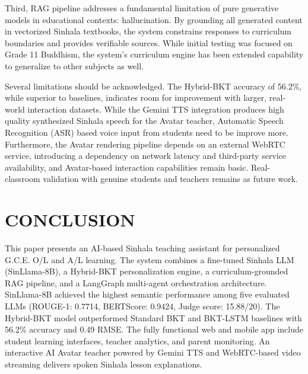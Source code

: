 \documentclass[conference]{IEEEtran}
\begin{document}
Third, RAG pipeline addresses a fundamental limitation of pure generative models in educational contexts: hallucination. By grounding all generated content in vectorized Sinhala textbooks, the system constrains responses to curriculum boundaries and provides verifiable sources. While initial testing was focused on Grade 11 Buddhism, the system's curriculum engine has been extended capability to generalize to other subjects as well.

Several limitations should be acknowledged. The Hybrid-BKT accuracy of 56.2\%, while superior to baselines, indicates room for improvement with larger, real-world interaction datasets. While the Gemini TTS integration produces high quality synthesized Sinhala speech for the Avatar teacher, Automatic Speech Recognition (ASR) based voice input from students need to be improve more. Furthermore, the Avatar rendering pipeline depends on an external WebRTC service, introducing a dependency on network latency and third-party service availability, and Avatar-based interaction capabilities remain basic. Real-classroom validation with genuine students and teachers remains as future work.

\section{CONCLUSION}
This paper presents an AI-based Sinhala teaching assistant for personalized G.C.E. O/L and A/L learning. The system combines a fine-tuned Sinhala LLM (SinLlama-8B), a Hybrid-BKT personalization engine, a curriculum-grounded RAG pipeline, and a LangGraph multi-agent orchestration architecture. SinLlama-8B achieved the highest semantic performance among five evaluated LLMs (ROUGE-1: 0.7714, BERTScore: 0.9424, Judge score: 15.88/20). The Hybrid-BKT model outperformed Standard BKT and BKT-LSTM baselines with 56.2\% accuracy and 0.49 RMSE. The fully functional web and mobile app include student learning interfaces, teacher analytics, and parent monitoring. An interactive AI Avatar teacher powered by Gemini TTS and WebRTC-based video streaming delivers spoken Sinhala lesson explanations.
\end{document}
